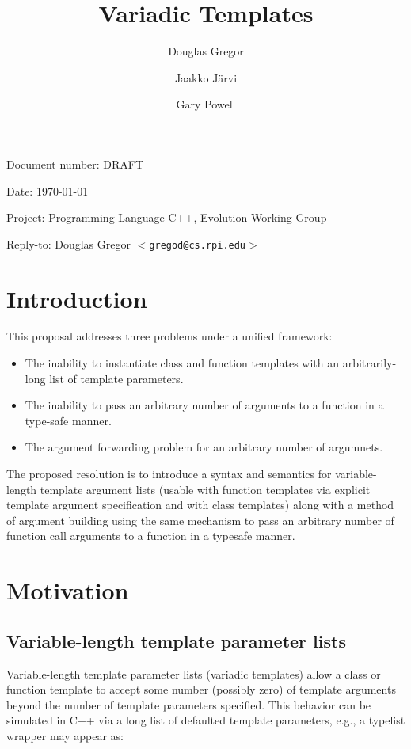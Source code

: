\documentclass{article}
\begin{document}
\pagestyle{myheadings}

\title{Variadic Templates}
\author{Douglas Gregor \and Jaakko J\"arvi \and Gary Powell}
\date{}
\maketitle

\par\noindent Document number: DRAFT
\par\noindent Date: \today
\par\noindent Project: Programming Language C++, Evolution Working Group
\par\noindent Reply-to: Douglas Gregor $<${\tt gregod@cs.rpi.edu}$>$

\section{Introduction}
This proposal addresses three problems under a unified framework:
\begin{itemize}
\item The inability to instantiate class and function templates with an arbitrarily-long list of template parameters.
\item The inability to pass an arbitrary number of arguments to a function in a type-safe manner.
\item The argument forwarding problem for an arbitrary number of argumnets.
\end{itemize}

The proposed resolution is to introduce a syntax and semantics for
variable-length template argument lists (usable with function templates
via explicit template argument specification and with class templates)
along with a method of argument building using the same mechanism to
pass an arbitrary number of function call arguments to a function in a
typesafe manner.

\section{Motivation}
\subsection{Variable-length template parameter lists}
Variable-length template parameter lists (variadic templates) allow a class or
function template to accept some number (possibly zero) of template
arguments beyond the number of template parameters specified. This
behavior can be simulated in C++ via a long list of defaulted template
parameters, e.g., a typelist wrapper may appear as:
\end{document}
